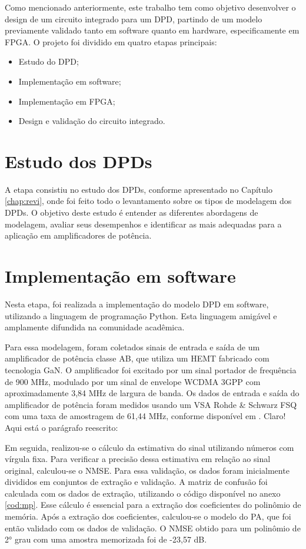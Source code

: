 Como mencionado anteriormente, este trabalho tem como objetivo desenvolver o design de um circuito integrado para um DPD, partindo de um modelo previamente validado tanto em software quanto em hardware, especificamente em FPGA. O projeto foi dividido em quatro etapas principais:

\begin{itemize}
\item Estudo do DPD;
\item Implementação em software;
\item Implementação em FPGA;
\item Design e validação do circuito integrado.
\end{itemize}


\section{Estudo dos DPDs}
A etapa consistiu no estudo dos DPDs, conforme apresentado no Capítulo \ref{chap:revi}, onde foi feito todo o levantamento sobre os tipos de modelagem dos DPDs. O objetivo deste estudo é entender as diferentes abordagens de modelagem, avaliar seus desempenhos e identificar as mais adequadas para a aplicação em amplificadores de potência.

\section{Implementação em software} \label{sec:implsoft}

Nesta etapa, foi realizada a implementação do modelo DPD em software, utilizando a linguagem de programação Python. Esta linguagem amigável e amplamente difundida na comunidade acadêmica.

Para essa modelagem, foram coletados sinais de entrada e saída de um amplificador de potência classe AB, que utiliza um HEMT fabricado com tecnologia GaN. O amplificador foi excitado por um sinal portador de frequência de 900 MHz, modulado por um sinal de envelope WCDMA 3GPP com aproximadamente 3,84 MHz de largura de banda. Os dados de entrada e saída do amplificador de potência foram medidos usando um VSA Rohde \& Schwarz FSQ com uma taxa de amostragem de 61,44 MHz, conforme disponível em \cite{Bonfim2016}.
Claro! Aqui está o parágrafo reescrito:

Em seguida, realizou-se o cálculo da estimativa do sinal utilizando números com vírgula fixa. Para verificar a precisão dessa estimativa em relação ao sinal original, calculou-se o NMSE. Para essa validação, os dados foram inicialmente divididos em conjuntos de extração e validação. A matriz de confusão foi calculada com os dados de extração, utilizando o código disponível no anexo \ref{cod:mp}. Esse cálculo é essencial para a extração dos coeficientes do polinômio de memória. Após a extração dos coeficientes, calculou-se o modelo do PA, que foi então validado com os dados de validação. O NMSE obtido para um polinômio de 2° grau com uma amostra memorizada foi de -23,57 dB.

